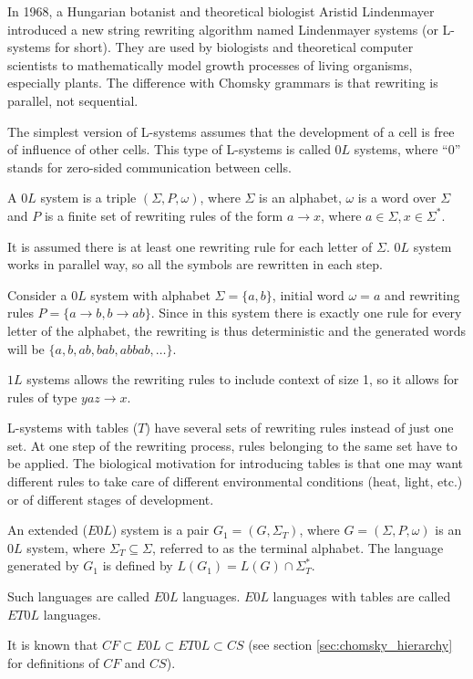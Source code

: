 In 1968, a Hungarian botanist and theoretical biologist Aristid Lindenmayer introduced \cite{Lindenmayer68} a new string rewriting algorithm named Lindenmayer systems (or L-systems for short). They are used by biologists and theoretical computer scientists to mathematically model growth processes of living organisms, especially plants. The difference with Chomsky grammars is that rewriting is parallel, not sequential.

The simplest version of L-systems assumes that the development of a cell is free of influence of other cells.
This type of L-systems is called $0L$ systems, where ``0'' stands for zero-sided communication between cells.

\begin{definition}
A $0L$ system is a triple $(\Sigma, P, \omega)$, where $\Sigma$ is an alphabet, $\omega$ is a word over $\Sigma$ and $P$ is a finite set of rewriting rules of the form $a\rightarrow x$, where $a\in\Sigma, x\in\Sigma^*$.
\end{definition}

It is assumed there is at least one rewriting rule for each letter of $\Sigma$. $0L$ system works in parallel way, so all the symbols are rewritten in each step.

\begin{example}
Consider a $0L$ system with alphabet $\Sigma = \{a,b\}$, initial word $\omega = a$ and rewriting rules $P = \{a\rightarrow b, b\rightarrow ab\}$.
Since in this system there is exactly one rule for every letter of the alphabet, the rewriting is thus deterministic and the generated words will be $\{a, b, ab, bab, abbab, \ldots \}$. 
\end{example}

$1L$ systems allows the rewriting rules to include context of size 1, so it allows for rules of type $yaz\rightarrow x$.

L-systems with tables ($T$) have several sets of rewriting rules instead of just one set. At one step of the rewriting process, rules belonging to the same set have to be applied. The biological motivation for introducing tables is that one may want different rules to take care of different environmental conditions (heat, light, etc.) or of different stages of development.

\begin{definition}
An extended ($E0L$) system is a pair $G_1 = (G, \Sigma_T)$, where $G = (\Sigma, P, \omega)$ is an $0L$ system, where $\Sigma_T \subseteq \Sigma$, referred to as the terminal alphabet. The language generated by $G_1$ is defined by $L(G_1) = L(G)\cap \Sigma_T^*$.
\end{definition}

Such languages are called $E0L$ languages. $E0L$ languages with tables are called $ET0L$ languages.

It is known that $CF \subset E0L \subset ET0L \subset CS$ (see section \ref{sec:chomsky_hierarchy} for definitions of $CF$ and $CS$).
